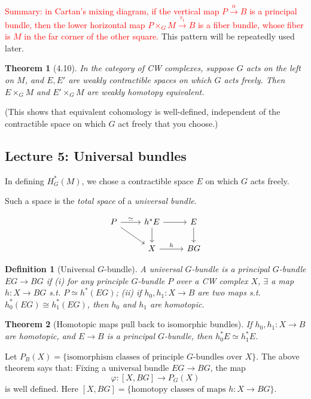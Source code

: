 \documentclass{article}
\theoremstyle{mystyle}
\newtheorem*{definition}{Definition}%
\newtheorem*{theorem*}{Theorem}
\theoremstyle{remark}
\numberwithin{equation}{section}
\begin{document}
\textcolor{red}{Summary: in Cartan's mixing diagram, if the vertical map $P\xrightarrow{\alpha} B$ is a principal bundle, then the lower horizontal map $P\times_G M\xrightarrow{\tau_1} B$ is a fiber bundle, whose fiber is $M$ in the far corner of the other square.} This pattern will be repeatedly used later.

\begin{theorem*}[4.10] In the category of CW complexes, suppose $G$ acts on the left on $M$, and $E,E'$ are weakly contractible spaces on which $G$ acts freely. Then
$E\times_G M$ and $E'\times_G M$ are weakly homotopy equivalent. 
\end{theorem*}

(This shows that equivalent cohomology is well-defined, independent of the contractible space on which $G$ act freely that you choose.)

\subsection{Lecture 5: Universal bundles}

In defining $H^*_G(M)$, we chose a contractible space $E$ on which $G$ acts freely.

Such a space is the \emph{total space} of a \emph{universal bundle}.

$$\begin{tikzcd} P \ar[r,"\simeq "]  \ar[dr] & h^*E\ar[d] \ar[r]& E \ar[d]\\
&X\ar[r,"h"] & BG \end{tikzcd}
$$

\begin{definition}[Universal $G$-bundle] A \emph{universal $G$-bundle} is a principal $G$-bundle $EG\rightarrow BG$ if (i) for any principle $G$-bundle $P$ over a CW complex $X$, $\exists$ a map $h\colon X\rightarrow BG$ s.t. $P\simeq h^*(EG)$; (ii) if $h_0,h_1\colon X\rightarrow B$ are two maps s.t. $h^*_0(EG)\cong h_1^*(EG)$, then $h_0$ and $h_1$ are homotopic.
\end{definition}

\begin{theorem*}[Homotopic maps pull back to isomorphic bundles] If $h_0,h_1\colon X\rightarrow B$ are homotopic, and $E\rightarrow B$ is a principal $G$-bundle, then $h_0^*E\simeq h_1^*E$. 
\end{theorem*}

Let $P_B(X) = \{\text{isomorphism classes of principle }G\text{-bundles over }X\}$.  The above theorem says that: Fixing a universal bundle $EG\rightarrow BG$, the map 
$$\varphi\colon [X,BG]\rightarrow P_G(X)$$ is well defined. Here $[X,BG]=\{\text{homotopy classes of maps }h\colon X\rightarrow BG\}$. 
\end{document}
